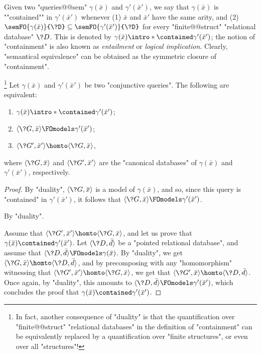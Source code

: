 Given two "queries@@sem" $\gamma(\bar x)$ and $\gamma'(\bar x')$,
we say that $\gamma(\bar x)$ is ""contained"" in $\gamma'(\bar x')$
whenever (1) $\bar x$ and $\bar x'$ have the same arity, and (2)
$\semFO{\gamma(\bar x)}{\?D} \subseteq \semFO{\gamma'(\bar x')}{\?D}$
for every "finite@@struct" "relational database" $\?D$. This is denoted by
$\gamma(\bar x) \intro*\contained \gamma'(\bar x')$; the notion
of "containment" is also known as \emph{entailment} or \emph{logical implication}.
Clearly, "semantical equivalence" can be obtained as the symmetric
closure of "containment".

\begin{proposition}
	\!\footnote{In fact, another consequence of "duality" is that
	the quantification over "finite@@struct" "relational databases"
	in the definition of "containment" can be equivalently replaced
	by a quantification over "finite structures", or even over all "structures"!}
	\AP\label{prop:containment-hom}
	Let $\gamma(\bar x)$ and $\gamma'(\bar x')$ be two "conjunctive queries".
	The following are equivalent:
	\begin{enumerate}
		\item $\gamma(\bar x) \intro*\contained \gamma'(\bar x')$;
		\item $\tup{\?G, \bar x} \FOmodels \gamma'(\bar x')$;
		\item $\tup{\?G', \bar x'} \homto \tup{\?G, \bar x}$,
	\end{enumerate}
	where $\tup{\?G, \bar x}$ and $\tup{\?G', \bar x'}$ are the "canonical databases"
	of $\gamma(\bar x)$ and $\gamma'(\bar x')$, respectively.
\end{proposition}

\begin{proof}
	By "duality", $\tup{\?G, \bar x}$ is a model of $\gamma(\bar x)$,
	and so, since this query is "contained" in $\gamma'(\bar x')$,
	it follows that $\tup{\?G, \bar x} \FOmodels \gamma'(\bar x')$.

	 By "duality".

	 Assume that
	$\tup{\?G', \bar x'} \homto \tup{\?G, \bar x}$,
	and let us prove that $\gamma(\bar x) \contained \gamma'(\bar x')$.
	Let $\tup{\?D, \bar d}$ be a "pointed relational database",
	and assume that $\tup{\?D, \bar d} \FOmodels \gamma(\bar x)$.
	By "duality", we get $\tup{\?G, \bar x} \homto \tup{\?D, \bar d}$,
	and by precomposing with any "homomorphism" witnessing
	that $\tup{\?G', \bar x'} \homto \tup{\?G, \bar x}$,
	we get that $\tup{\?G', \bar x} \homto \tup{\?D, \bar d}$.
	Once again, by "duality", this amounts to $\tup{\?D, \bar d} \FOmodels \gamma'(\bar x')$,
	which concludes the proof that $\gamma(\bar x) \contained \gamma'(\bar x')$.
\end{proof}

